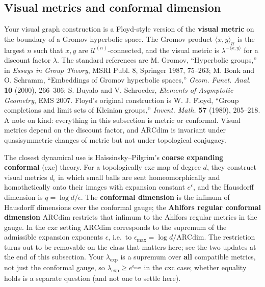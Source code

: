 \documentclass[
]{article}
\begin{document}
\subsection{Visual metrics and conformal
dimension}\label{visual-metrics-and-conformal-dimension}

Your visual graph construction is a Floyd-style version of the
\textbf{visual metric} on the boundary of a Gromov hyperbolic space. The
Gromov product \(\langle x,y\rangle_{\mathcal U}\) is the largest \(n\)
such that \(x,y\) are \(\mathcal U^{(n)}\)-connected, and the visual
metric is \(\lambda^{-\langle x,y\rangle}\) for a discount factor
\(\lambda\). The standard references are M. Gromov, ``Hyperbolic
groups,'' in \emph{Essays in Group Theory}, MSRI Publ. 8, Springer 1987,
75--263; M. Bonk and O. Schramm, ``Embeddings of Gromov hyperbolic
spaces,'' \emph{Geom. Funct. Anal.} \textbf{10} (2000), 266--306; S.
Buyalo and V. Schroeder, \emph{Elements of Asymptotic Geometry}, EMS
2007. Floyd's original construction is W. J. Floyd, ``Group completions
and limit sets of Kleinian groups,'' \emph{Invent. Math.} \textbf{57}
(1980), 205--218. A note on kind: everything in this subsection is
metric or conformal. Visual metrics depend on the discount factor, and
\(\mathrm{ARCdim}\) is invariant under quasisymmetric changes of metric
but not under topological conjugacy.

The closest dynamical use is Ha\"{i}ssinsky--Pilgrim's \textbf{coarse
expanding conformal} (cxc) theory. For a topologically cxc map of degree
\(d\), they construct visual metrics \(d_\epsilon\) in which small balls
are sent homeomorphically and homothetically onto their images with
expansion constant \(e^\epsilon\), and the Hausdorff dimension is
\(q=\log d/\epsilon\). The \textbf{conformal dimension} is the infimum
of Hausdorff dimensions over the conformal gauge; the \textbf{Ahlfors
regular conformal dimension} \(\mathrm{ARCdim}\) restricts that infimum
to the Ahlfors regular metrics in the gauge. In the cxc setting
\(\mathrm{ARCdim}\) corresponds to the supremum of the admissible
expansion exponents \(\epsilon\), i.e.~to
\(\epsilon_{\max}=\log d/\mathrm{ARCdim}\). The restriction turns out to
be removable on the class that matters here; see the two updates at the
end of this subsection. Your \(\lambda_{\exp}\) is a supremum over
\textbf{all} compatible metrics, not just the conformal gauge, so
\(\lambda_{\exp}\ge e^{\epsilon_{\max}}\) in the cxc case; whether
equality holds is a separate question (and not one to settle here).
\end{document}
